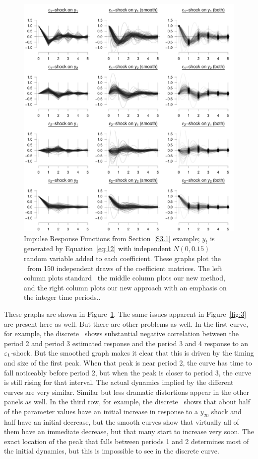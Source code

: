 \documentclass[12pt,fleqn]{article}
\begin{document}
\begin{figure}[t]
  \centering
  \includegraphics{graphs/numeric2.pdf}
  \caption{Impulse Response Functions from Section~\ref{S3.1} example;
    $y_t$ is generated by Equation~\eqref{eq:12} with independent
    $N(0,0.15)$ random variable added to each coefficient. These
    graphs plot the \IRFs\ from 150 independent draws of the
    coefficient matrices. The left column plots standard \IRFs\, the
    middle column plots our new method, and the right column plots our
    new approach with an emphasis on the integer time periods..}
  \label{fig:4}
\end{figure}

These graphs are shown in Figure~\ref{fig:4}. The same issues apparent
in Figure~\ref{fig:3} are present here as well. But there are other
problems as well. In the first curve, for example, the discrete \IRF\
shows substantial negative correlation between the period 2 and period
3 estimated response and the period 3 and 4 response to an
$\varepsilon_1$-shock. But the smoothed graph makes it clear that this is
driven by the timing and size of the first peak. When that peak is
near period 2, the curve has time to fall noticeably before period 2,
but when the peak is closer to period 3, the curve is still rising for
that interval. The actual dynamics implied by the different curves are
very similar. Similar but less dramatic distortions appear in the
other panels as well. In the third row, for example, the discrete
\IRF\ shows that about half of the parameter values have an initial
increase in response to a $y_{20}$ shock and half have an initial
decrease, but the smooth curves show that virtually all of them have
an immediate decrease, but that many start to increase very soon. The
exact location of the peak that falls between periods 1 and 2
determines most of the initial dynamics, but this is impossible to see
in the discrete curve.
\end{document}
